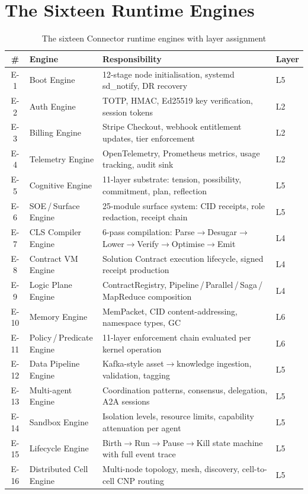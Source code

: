 \clearpage

\section{The Sixteen Runtime Engines}

\begin{table}[H]
\centering
\renewcommand{\arraystretch}{1.45}
\begin{tabularx}{\textwidth}{@{}clXl@{}}
\toprule
\textbf{\#} & \textbf{Engine} & \textbf{Responsibility} & \textbf{Layer} \\
\midrule
E-1  & Boot Engine           & 12-stage node initialisation, systemd sd\_notify, DR recovery & L5 \\
E-2  & Auth Engine           & TOTP, HMAC, Ed25519 key verification, session tokens & L2 \\
E-3  & Billing Engine        & Stripe Checkout, webhook entitlement updates, tier enforcement & L2 \\
E-4  & Telemetry Engine      & OpenTelemetry, Prometheus metrics, usage tracking, audit sink & L2 \\
E-5  & Cognitive Engine      & 11-layer substrate: tension, possibility, commitment, plan, reflection & L5 \\
E-6  & SOE\,/\,Surface Engine     & 25-module surface system: CID receipts, role redaction, receipt chain & L5 \\
E-7  & CLS Compiler Engine   & 6-pass compilation: Parse$\to$Desugar$\to$Lower$\to$Verify$\to$Optimise$\to$Emit & L4 \\
E-8  & Contract VM Engine    & Solution Contract execution lifecycle, signed receipt production & L4 \\
E-9  & Logic Plane Engine    & ContractRegistry, Pipeline\,/\,Parallel\,/\,Saga\,/\,MapReduce composition & L4 \\
E-10 & Memory Engine         & MemPacket, CID content-addressing, namespace types, GC & L6 \\
E-11 & Policy\,/\,Predicate Engine & 11-layer enforcement chain evaluated per kernel operation & L6 \\
E-12 & Data Pipeline Engine  & Kafka-style asset$\to$knowledge ingestion, validation, tagging & L5 \\
E-13 & Multi-agent Engine    & Coordination patterns, consensus, delegation, A2A sessions & L5 \\
E-14 & Sandbox Engine        & Isolation levels, resource limits, capability attenuation per agent & L5 \\
E-15 & Lifecycle Engine      & Birth$\to$Run$\to$Pause$\to$Kill state machine with full event trace & L5 \\
E-16 & Distributed Cell Engine & Multi-node topology, mesh, discovery, cell-to-cell CNP routing & L5 \\
\bottomrule
\end{tabularx}
\caption{The sixteen Connector runtime engines with layer assignment}
\end{table}

